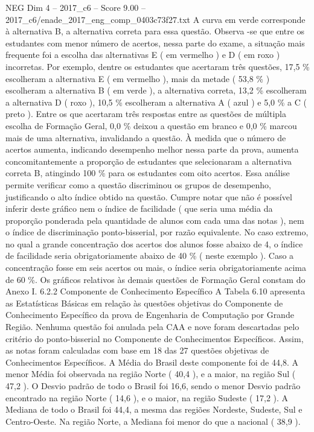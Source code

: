 \begin{textsample}{NEG Dim 4 – 2017\_c6 – Score 9.00 – 2017\_c6/enade\_2017\_eng\_comp\_0403c73f27.txt}
A curva em verde corresponde à alternativa B, a alternativa correta para essa questão.
Observa -se que entre os estudantes com menor número de acertos, nessa parte do exame, a situação mais frequente foi a escolha das alternativas E ( em vermelho ) e D ( em roxo ) incorretas.
Por exemplo, dentre os estudantes que acertaram três questões, 17,5 \% escolheram a alternativa E ( em vermelho ), mais da metade ( 53,8 \% ) escolheram a alternativa B ( em verde ), a alternativa correta, 13,2 \% escolheram a alternativa D ( roxo ), 10,5 \% escolheram a alternativa A ( azul ) e 5,0 \% a C ( preto ).
Entre os que acertaram três respostas entre as questões de múltipla escolha de Formação Geral, 0,0 \% deixou a questão em branco e 0,0 \% marcou mais de uma alternativa, invalidando a questão.
À medida que o número de acertos aumenta, indicando desempenho melhor nessa parte da prova, aumenta concomitantemente a proporção de estudantes que selecionaram a alternativa correta B, atingindo 100 \% para os estudantes com oito acertos.
Essa análise permite verificar como a questão discriminou os grupos de desempenho, justificando o alto índice obtido na questão.
Cumpre notar que não é possível inferir deste gráfico nem o índice de facilidade ( que seria uma média da proporção ponderada pela quantidade de alunos com cada uma das notas ), nem o índice de discriminação ponto-bisserial, por razão equivalente.
No caso extremo, no qual a grande concentração dos acertos dos alunos fosse abaixo de 4, o índice de facilidade seria obrigatoriamente abaixo de 40 \% ( neste exemplo ).
Caso a concentração fosse em seis acertos ou mais, o índice seria obrigatoriamente acima de 60 \%.
Os gráficos relativos às demais questões de Formação Geral constam do Anexo I. 6.2.2 Componente de Conhecimento Específico A Tabela 6.10 apresenta as Estatísticas Básicas em relação às questões objetivas do Componente de Conhecimento Específico da prova de Engenharia de Computação por Grande Região.
Nenhuma questão foi anulada pela CAA e nove foram descartadas pelo critério do ponto-bisserial no Componente de Conhecimentos Específicos.
Assim, as notas foram calculadas com base em 18 das 27 questões objetivas de Conhecimentos Específicos.
A Média do Brasil deste componente foi de 44,8.
A menor Média foi observada na região Norte ( 40,4 ), e a maior, na região Sul ( 47,2 ).
O Desvio padrão de todo o Brasil foi 16,6, sendo o menor Desvio padrão encontrado na região Norte ( 14,6 ), e o maior, na região Sudeste ( 17,2 ).
A Mediana de todo o Brasil foi 44,4, a mesma das regiões Nordeste, Sudeste, Sul e Centro-Oeste.
Na região Norte, a Mediana foi menor do que a nacional ( 38,9 ).

\end{textsample}

